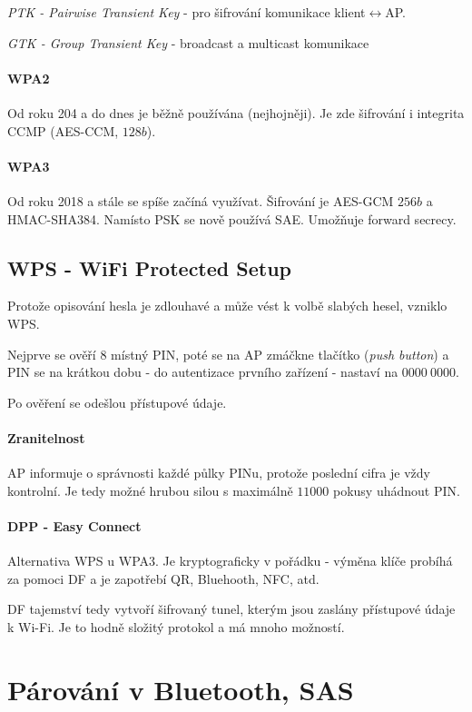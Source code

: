 \documentclass[10pt,a4paper]{article}
\begin{document}
\textit{PTK - Pairwise Transient Key} - pro šifrování komunikace klient$ \leftrightarrow $AP.

\textit{GTK - Group Transient Key} - broadcast a multicast komunikace

\paragraph{WPA2} 
Od roku 204 a do dnes je běžně používána (nejhojněji).
Je zde šifrování i integrita CCMP (AES-CCM, $ 128b $).

\paragraph{WPA3} Od roku 2018 a stále se spíše začíná využívat.
Šifrování je AES-GCM $ 256b $ a HMAC-SHA384. Namísto PSK se nově používá SAE.
Umožňuje forward secrecy.

\subsection{WPS - WiFi Protected Setup}
Protože opisování hesla je zdlouhavé a může vést k volbě slabých hesel, vzniklo WPS.

Nejprve se ověří $ 8 $ místný PIN, poté se na AP zmáčkne tlačítko (\textit{push button}) a PIN se na krátkou dobu - do autentizace prvního zařízení - nastaví na $ 0000~0000 $.

Po ověření se odešlou přístupové údaje.

\paragraph{Zranitelnost} AP informuje o správnosti každé půlky PINu, protože poslední cifra je vždy kontrolní. 
Je tedy možné hrubou silou s maximálně $ 11000 $ pokusy uhádnout PIN.

\paragraph{DPP - Easy Connect}
Alternativa WPS u WPA3. Je kryptograficky v pořádku - výměna klíče probíhá za pomoci DF a je zapotřebí QR, Bluehooth, NFC, atd.

DF tajemství tedy vytvoří šifrovaný tunel, kterým jsou zaslány přístupové údaje k Wi-Fi. Je to hodně složitý protokol a má mnoho možností.


\section{Párování v Bluetooth, SAS}
\end{document}
